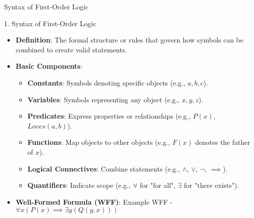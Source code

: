 \documentclass[aspectratio=169]{beamer}
\begin{document}
\begin{frame}[fragile]{Syntax of First-Order Logic}
    \begin{block}{1. Syntax of First-Order Logic}
        \begin{itemize}
            \item \textbf{Definition}: The formal structure or rules that govern how symbols can be combined to create valid statements.
            \item \textbf{Basic Components}:
            \begin{itemize}
                \item \textbf{Constants}: Symbols denoting specific objects (e.g., \(a, b, c\)).
                \item \textbf{Variables}: Symbols representing any object (e.g., \(x, y, z\)).
                \item \textbf{Predicates}: Express properties or relationships (e.g., \(P(x)\), \(Loves(a, b)\)).
                \item \textbf{Functions}: Map objects to other objects (e.g., \(F(x)\) denotes the father of \(x\)).
                \item \textbf{Logical Connectives}: Combine statements (e.g., \(\land\), \(\lor\), \(\neg\), \(\implies\)).
                \item \textbf{Quantifiers}: Indicate scope (e.g., \(\forall\) for "for all", \(\exists\) for "there exists").
            \end{itemize}
            \item \textbf{Well-Formed Formula (WFF)}: Example WFF - \(\forall x (P(x) \implies \exists y (Q(y, x)))\)
        \end{itemize}
    \end{block}
\end{frame}
\end{document}
